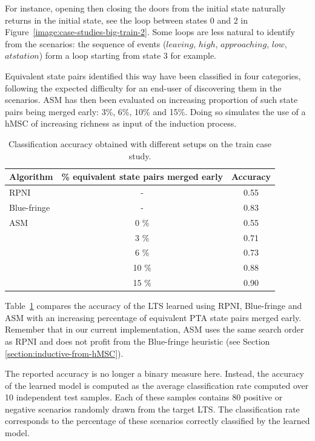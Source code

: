 For instance, opening then closing the doors from the initial state naturally returns in the initial state, see the loop between states 0 and 2 in Figure~\ref{image:case-studies-big-train-2}. Some loops are less natural to identify from the scenarios: the sequence of events ($leaving$, $high$, $approaching$, $low$, $at station$) form a loop starting from state 3 for example. 

Equivalent state pairs identified this way have been classified in four categories, following the expected difficulty for an end-user of discovering them in the scenarios. ASM has then been evaluated on increasing proportion of such state pairs being merged early: 3\%, 6\%, 10\% and 15\%. Doing so simulates the use of a hMSC of increasing richness as input of the induction process. 

\begin{table}[H]
\centering
\small
\begin{tabular}{|l|c|c|}\hline
Algorithm& \% equivalent state pairs merged early &Accuracy\\\hline\hline
RPNI      & -    & 0.55\\\hline
Blue-fringe& -   & 0.83\\\hline
ASM       & 0 \%  & 0.55\\\cline{2-3}
          & 3 \%  & 0.71\\\cline{2-3}
          & 6 \%  & 0.73\\\cline{2-3}
          & 10 \% & 0.88\\\cline{2-3}
          & 15 \% & 0.90\\\hline
\end{tabular}
\caption{Classification accuracy obtained with different setups on the train case study.\label{RE:experesults}}
\end{table} 

Table~\ref{RE:experesults} compares the accuracy of the LTS learned using RPNI, Blue-fringe and ASM with an increasing percentage of equivalent PTA state pairs merged early. Remember that in our current implementation, ASM uses the same search order as RPNI and does not profit from the Blue-fringe heuristic (see Section \ref{section:inductive-from-hMSC}).

The reported accuracy is no longer a binary measure here. Instead, the accuracy of the learned model is computed as the average classification rate computed over 10 independent test samples. Each of these samples contains 80 positive or negative scenarios randomly drawn from the target LTS. The classification rate corresponds to the percentage of these scenarios correctly classified by the learned model. 

